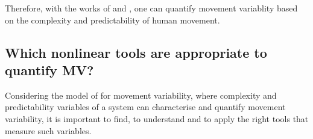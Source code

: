 Therefore, with the works 
of \cite{vaillancourt2002, vaillancourt2003} and \cite{stergiou2006},
one can quantify movement variablity 
based on the complexity and predictability of human movement.


\subsection{Which nonlinear tools are appropriate to quantify MV?} 
\label{which_NT_are_appropriate_to_measure_MV}


Considering the model of \cite{stergiou2006} for movement variability,
where complexity and predictability variables of a system can 
characterise and quantify movement variability, it is important to 
find, to understand and to apply the right tools that measure such variables.

